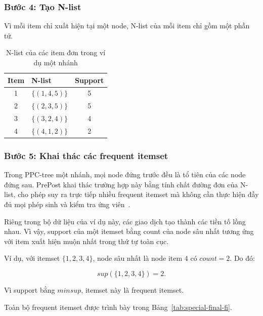 \subsubsection{Bước 4: Tạo N-list}

Vì mỗi item chỉ xuất hiện tại một node, N-list của mỗi item chỉ gồm một phần tử.

\begin{table}[H]
\centering
\caption{N-list của các item đơn trong ví dụ một nhánh}
\label{tab:special-single-nlists}
\begin{tabular}{clc}
\toprule
Item & N-list & Support \\
\midrule
1 & $\{(1,4,5)\}$ & 5 \\
2 & $\{(2,3,5)\}$ & 5 \\
3 & $\{(3,2,4)\}$ & 4 \\
4 & $\{(4,1,2)\}$ & 2 \\
\bottomrule
\end{tabular}
\end{table}

\subsubsection{Bước 5: Khai thác các frequent itemset}

Trong PPC-tree một nhánh, mọi node đứng trước đều là tổ tiên của các node
đứng sau. PrePost khai thác trường hợp này bằng tính chất đường đơn của N-list,
cho phép suy ra trực tiếp nhiều frequent itemset mà không cần thực hiện đầy đủ
mọi phép sinh và kiểm tra ứng viên~\cite{deng2012prepost}.

Riêng trong bộ dữ liệu của ví dụ này, các giao dịch tạo thành các tiền tố lồng
nhau. Vì vậy, support của một itemset bằng count của node sâu nhất tương ứng
với item xuất hiện muộn nhất trong thứ tự toàn cục.

Ví dụ, với itemset $\{1,2,3,4\}$, node sâu nhất là node item $4$ có $count=2$. Do đó:

\begin{equation}
    sup(\{1,2,3,4\})=2.
    \label{eq:special-support-1234}
\end{equation}

Vì support bằng $\mathit{minsup}$, itemset này là frequent itemset.

Toàn bộ frequent itemset được trình bày trong Bảng~\ref{tab:special-final-fi}.

